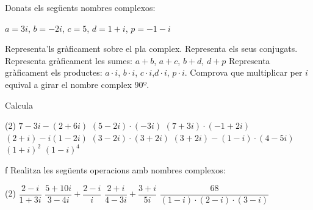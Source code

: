 \begin{mylist}
\exer
Donats els següents nombres complexos:

\begin{center}
	$a=3i$, \quad
	$b=-2i$,\quad
	$c=5$,\quad
	$d=1+i$,\quad
	$p= -1 -i$
\end{center}

\begin{tasks}
	\task Representa'ls gràficament sobre el pla complex. Representa els seus conjugats.
	\task Representa gràficament les sumes: $a+b$, \quad $a+c$, \quad $b+d$, \quad $d+p$
	\task Representa gràficament els productes: $a\cdot i$, \quad  $b\cdot i$, \quad $c\cdot i$,\quad $d\cdot i$, \quad $p\cdot i$. Comprova que multiplicar per $i$ equival a girar el nombre complex 90º.
\end{tasks} 

\vspace{3cm}

	\exer[1] Calcula

	\begin{tasks}(2)
		\task  $7 - 3i - (2 + 6 i)$
		\task  $(5 - 2i)\cdot (-3 i)$
		\task  $( 7 + 3 i) \cdot (-1 + 2 i)$
		\task  $(2+i)-i (1-2 i)$
		\task $(3-2 i) \cdot (3+ 2 i)$
		\task $(3 + 2i) - (1-i)\cdot(4-5i)$
	    \task $(1 + i)^2$
		\task $(1 - i)^4$
	\end{tasks}
	\answers[cols=2]{[
			 $5 -9i$,
			 $-6-15i$,
			 $-13+11i$,
			 0,
			 13,
			 $4 + 11i$,
			 $2i$,
			 $-4$]}
 ƒ
	\exer[1]
	Realitza les següents operacions amb nombres complexos:
	\begin{tasks}(2)
		\task $\dfrac{2-i}{1+3 i}$
		\task $\dfrac{5+10 i}{3-4 i}+\dfrac{2-i}{i}$
		\task $\dfrac{2+i}{4-3 i} + \dfrac{3+i}{5 i}$
		\task $\dfrac{68}{(1-i) \cdot (2-i) \cdot (3-i)}$
	\end{tasks}
	 
 
\end{mylist}

